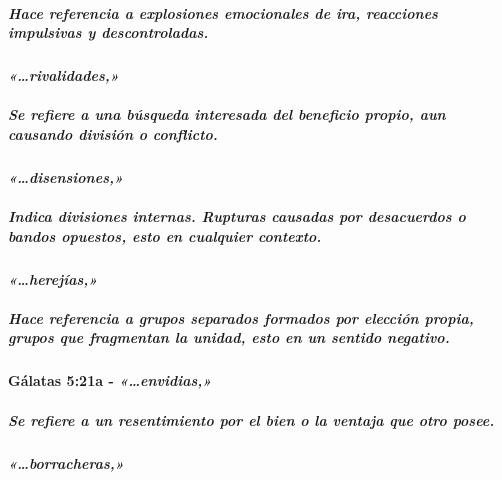 \documentclass[11a pt,twoside]{article}
\newcommand{\scripture}[1]{%
  {\fontsize{12pt}{16pt}\selectfont\ScriptureFont\itshape #1}%
}
\let\oldparagraph\paragraph
\renewcommand{\paragraph}{\needspace{3\baselineskip}\oldparagraph}
\let\oldsubparagraph\subparagraph
\renewcommand{\subparagraph}{\needspace{2\baselineskip}\oldsubparagraph}
\begin{document}
\subparagraph{Hace referencia a explosiones emocionales de ira,
reacciones impulsivas y
descontroladas.}\label{hace-referencia-a-explosiones-emocionales-de-ira-reacciones-impulsivas-y-descontroladas.}

\paragraph{\texorpdfstring{\scripture{«…rivalidades,»}}{}}\label{rivalidades}

\subparagraph{Se refiere a una búsqueda interesada del beneficio propio,
aun causando división o
conflicto.}\label{se-refiere-a-una-buxfasqueda-interesada-del-beneficio-propio-aun-causando-divisiuxf3n-o-conflicto.}

\paragraph{\texorpdfstring{\scripture{«…disensiones,»}}{}}\label{disensiones}

\subparagraph{Indica divisiones internas. Rupturas causadas por
desacuerdos o bandos opuestos, esto en cualquier
contexto.}\label{indica-divisiones-internas.-rupturas-causadas-por-desacuerdos-o-bandos-opuestos-esto-en-cualquier-contexto.}

\paragraph{\texorpdfstring{\scripture{«…herejías,»}}{}}\label{herejuxedas}

\subparagraph{Hace referencia a grupos separados formados por elección
propia, grupos que fragmentan la unidad, esto en un sentido
negativo.}\label{hace-referencia-a-grupos-separados-formados-por-elecciuxf3n-propia-grupos-que-fragmentan-la-unidad-esto-en-un-sentido-negativo.}

\paragraph{\texorpdfstring{Gálatas 5:21a -
\scripture{«…envidias,»}}{Gálatas 5:21a - }}\label{guxe1latas-521a---envidias}

\subparagraph{Se refiere a un resentimiento por el bien o la ventaja que
otro
posee.}\label{se-refiere-a-un-resentimiento-por-el-bien-o-la-ventaja-que-otro-posee.}

\paragraph{\texorpdfstring{\scripture{«…borracheras,»}}{}}\label{borracheras}
\end{document}
